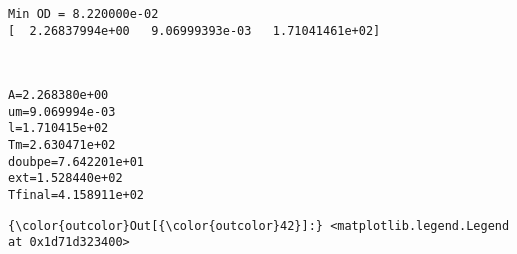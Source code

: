 \documentclass[11pt]{article}
\begin{document}
    \begin{Verbatim}[commandchars=\\\{\}]
Min OD = 8.220000e-02
[  2.26837994e+00   9.06999393e-03   1.71041461e+02]

    \end{Verbatim}

    \begin{center}
    \end{center}
    { \hspace*{\fill} \\}
    
    \begin{Verbatim}[commandchars=\\\{\}]
A=2.268380e+00
um=9.069994e-03
l=1.710415e+02
Tm=2.630471e+02
doubpe=7.642201e+01
ext=1.528440e+02
Tfinal=4.158911e+02

    \end{Verbatim}

            \begin{Verbatim}[commandchars=\\\{\}]
{\color{outcolor}Out[{\color{outcolor}42}]:} <matplotlib.legend.Legend at 0x1d71d323400>
\end{Verbatim}
        
    \begin{center}
    \end{center}
    { \hspace*{\fill} \\}
    
    \begin{center}
    \end{center}
    { \hspace*{\fill} \\}
    
\end{document}
